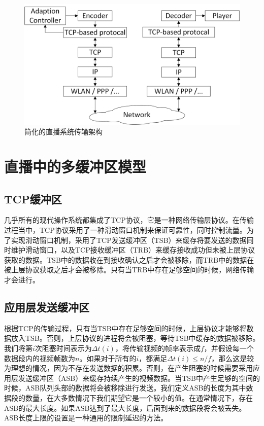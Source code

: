 \begin{figure}[h]
	\centering
	\includegraphics[width = 0.9\linewidth]{clip/08.png}
	\caption{简化的直播系统传输架构\label{fig:08}}
\end{figure}

\section{直播中的多缓冲区模型}

\subsection{TCP缓冲区}

几乎所有的现代操作系统都集成了TCP协议，它是一种网络传输层协议。在传输过程当中，TCP协议采用了一种滑动窗口机制来保证可靠性，同时控制流量。为了实现滑动窗口机制，采用了TCP发送缓冲区（TSB）来缓存将要发送的数据同时维护滑动窗口，以及TCP接收缓冲区（TRB）来缓存接收成功但未被上层协议获取的数据。TSB中的数据收在到接收确认之后才会被移除，而TRB中的数据在被上层协议获取之后才会被移除。只有当TRB中存在足够空间的时候，网络传输才会进行。

\subsection{应用层发送缓冲区}

根据TCP的传输过程，只有当TSB中存在足够空间的时候，上层协议才能够将数据放入TSB。否则，上层协议的进程将会被阻塞，等待TSB中缓存的数据被移除。我们将第$i$次阻塞时间表示为$\varDelta t(i)$，将传输视频的帧率表示成$f$，并假设每一个数据段内的视频帧数为$n$。如果对于所有的$i$，都满足$\varDelta t(i) \le n/f$，那么这是较为理想的情况，因为不存在发送数据的积累。否则，在产生阻塞的时候需要采用应用层发送缓冲区（ASB）来缓存持续产生的视频数据。当TSB中产生足够的空间的时候，ASB队列头部的数据将会被移除进行发送。我们定义ASB的长度为其中数据段的数量，在大多数情况下我们期望它是一个较小的值。在通常情况下，存在ASB的最大长度。如果ASB达到了最大长度，后面到来的数据段将会被丢失。ASB长度上限的设置是一种通用的限制延迟的方法。

